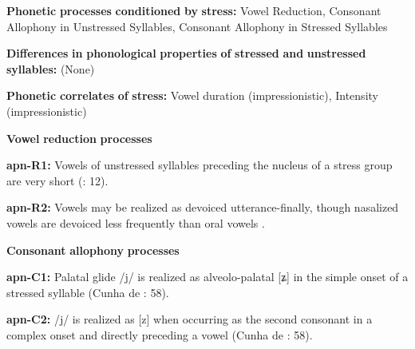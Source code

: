 \begin{styleBody}
\textbf{Phonetic} \textbf{processes} \textbf{conditioned} \textbf{by} \textbf{stress:} Vowel Reduction, Consonant Allophony in Unstressed Syllables, Consonant Allophony in Stressed Syllables
\end{styleBody}

\begin{styleBody}
\textbf{Differences} \textbf{in} \textbf{phonological} \textbf{properties} \textbf{of} \textbf{stressed} \textbf{and} \textbf{unstressed} \textbf{syllables:} (None)
\end{styleBody}

\begin{styleBody}
\textbf{Phonetic} \textbf{correlates} \textbf{of} \textbf{stress:} Vowel duration (impressionistic), Intensity (impressionistic)
\end{styleBody}

\begin{styleBody}
\textbf{Vowel} \textbf{reduction} \textbf{processes}
\end{styleBody}

\begin{styleBody}
\textbf{apn-R1:} Vowels of unstressed syllables preceding the nucleus of a stress group are very short (\citealt{BurgessHam1968}: 12).
\end{styleBody}

\begin{styleBody}
\textbf{apn-R2:} Vowels may be realized as devoiced utterance-finally, though nasalized vowels are devoiced less frequently than oral vowels \citep[7]{Ham2009}.
\end{styleBody}

\begin{styleBody}
\textbf{Consonant} \textbf{allophony} \textbf{processes}
\end{styleBody}

\begin{styleBody}
\textbf{apn-C1:} Palatal glide /j/ is realized as alveolo-palatal [ʑ] in the simple onset of a stressed syllable (Cunha de \citealt{Oliveira2005}: 58).
\end{styleBody}

\begin{styleBody}
\textbf{apn-C2:} /j/ is realized as [z] when occurring as the second consonant in a complex onset and directly preceding a vowel (Cunha de \citealt{Oliveira2005}: 58).
\end{styleBody}

